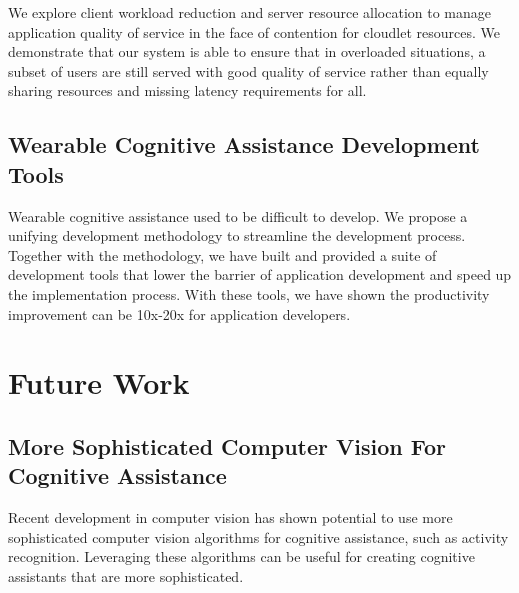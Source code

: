 We explore client workload reduction and server resource allocation to manage
application quality of service in the face of contention for cloudlet resources.
We demonstrate that our system is able to ensure that in overloaded situations,
a subset of users are still served with good quality of service rather than
equally sharing resources and missing latency requirements for all.

\subsection{Wearable Cognitive Assistance Development Tools}

Wearable cognitive assistance used to be difficult to develop. We propose a
unifying development methodology to streamline the development process. Together
with the methodology, we have built and provided a suite of development tools
that lower the barrier of application development and speed up the
implementation process. With these tools, we have shown the productivity
improvement can be 10x-20x for application developers.

\section{Future Work}

\subsection{More Sophisticated Computer Vision For Cognitive Assistance}
Recent development in computer vision has shown potential to use more
sophisticated computer vision algorithms for cognitive assistance, such as
activity recognition. Leveraging these algorithms can be useful for creating
cognitive assistants that are more sophisticated.

